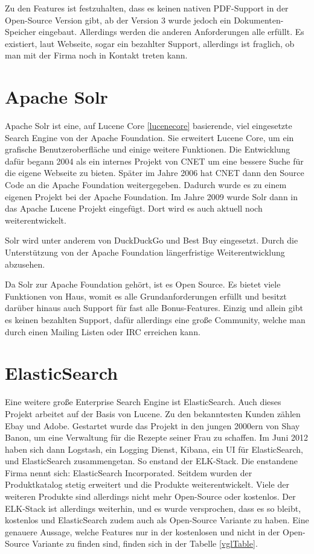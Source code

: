 Zu den Features ist festzuhalten, dass es keinen nativen PDF-Support in der Open-Source Version gibt, ab der Version 3 wurde jedoch ein Dokumenten-Speicher eingebaut. Allerdings werden die anderen Anforderungen alle erfüllt. Es existiert, laut Webseite, sogar ein bezahlter Support, allerdings ist fraglich, ob man mit der Firma noch in Kontakt treten kann. \cite{SphinxTechnologiesInc.2019}

\section{Apache Solr}
\label{solr}

Apache Solr ist eine, auf Lucene Core \ref{lucenecore} basierende, viel eingesetzte Search Engine von der Apache Foundation. Sie erweitert Lucene Core, um ein grafische Benutzeroberfläche und einige weitere Funktionen. 
Die Entwicklung dafür begann 2004 als ein internes Projekt von CNET um eine bessere Suche für die eigene Webseite zu bieten. Später im Jahre 2006 hat CNET dann den Source Code an die Apache Foundation weitergegeben. Dadurch wurde  es zu einem eigenen Projekt bei der Apache Foundation. Im Jahre 2009 wurde Solr dann in das Apache Lucene Projekt eingefügt. Dort wird es auch aktuell noch weiterentwickelt. \cite{Wikipedia.2019b}

Solr wird unter anderem von DuckDuckGo und Best Buy eingesetzt. Durch die Unterstützung von der Apache Foundation längerfristige Weiterentwicklung abzusehen. 

Da Solr zur Apache Foundation gehört, ist es Open Source. Es bietet viele Funktionen von Haus, womit es alle Grundanforderungen erfüllt und besitzt darüber hinaus auch Support für fast alle Bonus-Features. Einzig und allein gibt es keinen bezahlten Support, dafür allerdings eine große Community, welche man durch einen Mailing Listen oder IRC erreichen kann. \cite{TheApacheSoftwareFoundation.2019}

\section{ElasticSearch}
\label{elasticsearch}

Eine weitere große Enterprise Search Engine ist ElasticSearch. Auch dieses Projekt arbeitet auf der Basis von Lucene. Zu den bekanntesten Kunden zählen Ebay und Adobe. Gestartet wurde das Projekt in den jungen 2000ern von Shay Banon, um eine Verwaltung für die Rezepte seiner Frau zu schaffen. Im Juni 2012 haben sich dann Logstash, ein Logging Dienst, Kibana, ein UI für ElasticSearch, und ElasticSearch zusammengetan. So enstand der ELK-Stack. Die enstandene Firma nennt sich: ElasticSearch Incorporated. Seitdem wurden der Produktkatalog stetig erweitert und die Produkte weiterentwickelt. Viele der weiteren Produkte sind allerdings nicht mehr Open-Source oder kostenlos. Der ELK-Stack ist allerdings weiterhin, und es wurde versprochen, dass es so bleibt, kostenlos und ElasticSearch zudem auch als Open-Source Variante zu haben. Eine genauere Aussage, welche Features nur in der kostenlosen und nicht in der Open-Source Variante zu finden sind, finden sich in der Tabelle \ref{vglTable}.

